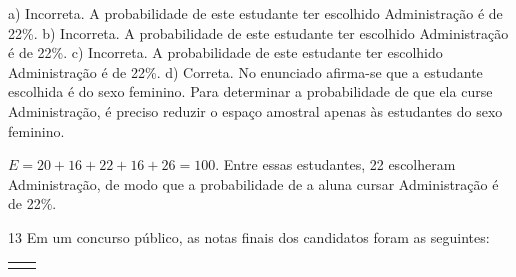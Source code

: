 \begin{escolha}
\begin{boxmedio}
\begin{boxmedio}
{\begin{boxpeq}
\begin{boxpeq}
{\begin{boxpeq}
\begin{boxmedio}
\begin{boxmedio}
\begin{boxpeq}
\begin{boxmedio}
\begin{boxpeq}
\begin{boxpeq}
\begin{boxpeq}
\begin{boxpeq}
\begin{boxmedio}
{\begin{boxmedio}
\begin{boxmedio}
\begin{boxpeq}
\begin{boxmedio}
\begin{boxpeq}
\begin{boxpeq}
\begin{boxpeq}
\begin{escolha}
{\begin{boxmedio}
\begin{boxpeq}
\begin{boxpeq}
\begin{boxpeq}
\begin{boxpeq}
\begin{boxpeq}
\begin{boxmedio}
\begin{boxpeq}
\begin{boxpeq}
\begin{boxpeq}
{\begin{boxpeq}
\begin{boxmedio}
\begin{boxpeq}
\begin{boxpeq}
\begin{boxpeq}
{\begin{boxpeq}
\begin{boxmedio}
{\begin{boxpeq}
\begin{boxpeq}
\begin{boxmedio}
\begin{boxmedio}
\begin{boxpeq}
\begin{boxpeq}
{\begin{boxpeq}
\begin{boxpeq}
\begin{boxpeq}
\begin{boxpeq}
\begin{boxpeq}
\begin{escolha}
\begin{escolha}
{\begin{boxmedio}
\begin{boxpeq}
\begin{q°}
\begin{boxmedio}
\begin{boxpeq}
\begin{boxpeq}
\begin{boxmedio}
\begin{boxmedio}
\begin{boxmedio}
\begin{boxmedio}
{\begin{enumerate}
\begin{boxpeq}
{\begin{boxpeq}
\begin{boxpeq}
\begin{boxmedio}
\begin{boxpeq}
\begin{boxpeq}
\begin{boxpeq}
\begin{escolha}
\begin{escolha}
{a) Incorreta. A probabilidade de este estudante ter escolhido Administração é de 22\%.
b) Incorreta. A probabilidade de este estudante ter escolhido Administração é de 22\%.
c) Incorreta. A probabilidade de este estudante ter escolhido Administração é de 22\%.
d) Correta. No enunciado afirma-se que a estudante escolhida é do sexo feminino. Para
determinar a probabilidade de que ela curse Administração, é preciso
reduzir o espaço amostral apenas às estudantes do sexo 
feminino.

$E = 20 + 16 + 22 +16 + 26 = 100$. Entre essas estudantes, 22 escolheram 
Administração, de modo que a probabilidade de a aluna cursar Administração é de
22\%.}

\num{13} Em um concurso público, as notas finais dos candidatos foram
as seguintes:

\begin{table}[]
\begin{tabular}{|c|c|}
\hline
\rowcolor[HTML]{9698ED} 

\end{tabular}
\end{table}
\end{escolha}
\end{escolha}
\end{boxpeq}
\end{boxpeq}
\end{boxpeq}
\end{boxmedio}
\end{boxpeq}
\end{boxpeq}}
\end{boxpeq}
\end{enumerate}}
\end{boxmedio}
\end{boxmedio}
\end{boxmedio}
\end{boxmedio}
\end{boxpeq}
\end{boxpeq}
\end{boxmedio}
\end{q°}
\end{boxpeq}
\end{boxmedio}}
\end{escolha}
\end{escolha}
\end{boxpeq}
\end{boxpeq}
\end{boxpeq}
\end{boxpeq}
\end{boxpeq}}
\end{boxpeq}
\end{boxpeq}
\end{boxmedio}
\end{boxmedio}
\end{boxpeq}
\end{boxpeq}}
\end{boxmedio}
\end{boxpeq}}
\end{boxpeq}
\end{boxpeq}
\end{boxpeq}
\end{boxmedio}
\end{boxpeq}}
\end{boxpeq}
\end{boxpeq}
\end{boxpeq}
\end{boxmedio}
\end{boxpeq}
\end{boxpeq}
\end{boxpeq}
\end{boxpeq}
\end{boxpeq}
\end{boxmedio}}
\end{escolha}
\end{boxpeq}
\end{boxpeq}
\end{boxpeq}
\end{boxmedio}
\end{boxpeq}
\end{boxmedio}
\end{boxmedio}}
\end{boxmedio}
\end{boxpeq}
\end{boxpeq}
\end{boxpeq}
\end{boxpeq}
\end{boxmedio}
\end{boxpeq}
\end{boxmedio}
\end{boxmedio}
\end{boxpeq}}
\end{boxpeq}
\end{boxpeq}}
\end{boxmedio}
\end{boxmedio}
\end{escolha}
